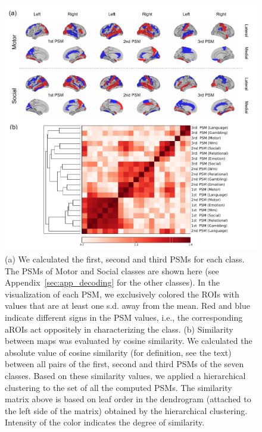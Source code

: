 \begin{figure}[htpb]
\begin{center}
\includegraphics[width=1.\columnwidth]{fig/psa_and_similarity.pdf}
\caption{\label{fig:PSA}
(a)
We calculated the first, second and third PSMs for each class. The PSMs
 of Motor and Social classes are shown here (see Appendix~\ref{sec:app_decoding} for the other classes).
In the visualization of each PSM, we exclusively colored the ROIs with values that are at least one s.d. away from the mean.
Red and blue indicate different signs in the PSM values, i.e., the corresponding aROIs act oppositely in characterizing the class.
(b)
Similarity between maps was evaluated by cosine similarity.
We calculated the absolute value of cosine similarity (for definition,
 see the text) between all pairs of the first, second and third  PSMs of the seven classes. Based on these similarity values, we applied a hierarchical clustering to the set of all the computed PSMs.
The similarity matrix above is based on leaf order in the dendrogram (attached to the left side of the matrix) obtained by the hierarchical clustering. Intensity of the color indicates the degree of similarity.
}
\end{center}
\end{figure}
